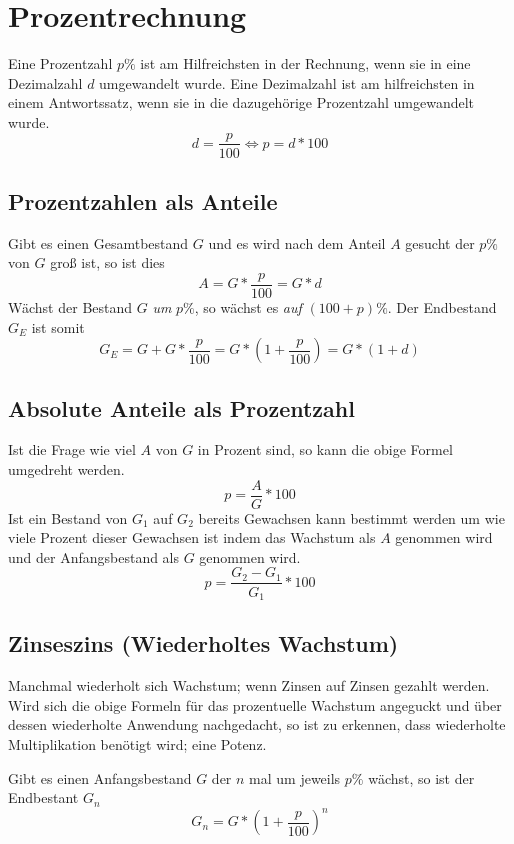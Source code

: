 \documentclass{article}
\begin{document}
\section{Prozentrechnung} 
Eine Prozentzahl $p\%$ ist am Hilfreichsten in der Rechnung, wenn sie in eine Dezimalzahl $d$ umgewandelt wurde. Eine Dezimalzahl ist am hilfreichsten in einem Antwortssatz, wenn sie in die dazugehörige Prozentzahl umgewandelt wurde.
\[
 d = \frac{p}{100} \Leftrightarrow p = d * 100
\]

\subsection{Prozentzahlen als Anteile}
Gibt es einen Gesamtbestand $G$ und es wird nach dem Anteil $A$ gesucht der $p\%$ von $G$ groß ist, so ist dies
\[
 A = G * \frac{p}{100} = G * d
\]
Wächst der Bestand $G$ \emph{um} $p\%$, so wächst es \emph{auf} $(100+p)\%$. Der Endbestand $G_E$ ist somit
\[
 G_E = G + G * \frac{p}{100} = G * \left(1+\frac{p}{100}\right) = G * (1+d)
\]

\subsection{Absolute Anteile als Prozentzahl}
Ist die Frage wie viel $A$ von $G$ in Prozent sind, so kann die obige Formel umgedreht werden.
\[
 p = \frac{A}{G} * 100
\]
Ist ein Bestand von $G_1$ auf $G_2$ bereits Gewachsen kann bestimmt werden um wie viele Prozent dieser Gewachsen ist indem das Wachstum als $A$ genommen wird und der Anfangsbestand als $G$ genommen wird.
\[
 p = \frac{G_2-G_1}{G_1} * 100
\]

\subsection{Zinseszins (Wiederholtes Wachstum)}
Manchmal wiederholt sich Wachstum; \zb wenn Zinsen auf Zinsen gezahlt werden. Wird sich die obige Formeln für das prozentuelle Wachstum angeguckt und über dessen wiederholte Anwendung nachgedacht, so ist zu erkennen, dass wiederholte Multiplikation benötigt wird; eine Potenz.

Gibt es einen Anfangsbestand $G$ der $n$ mal um jeweils $p\%$ wächst, so ist der Endbestant $G_n$
\[
 G_n = G * \left(1+\frac{p}{100}\right)^n
\]
\end{document}
